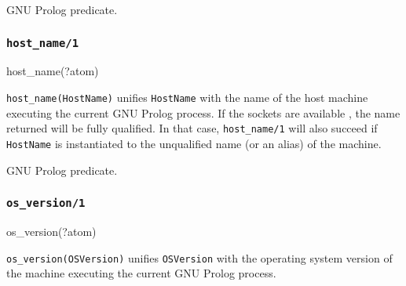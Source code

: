 \Portability

GNU Prolog predicate.

\subsubsection{\texttt{host\_name/1}}

\begin{TemplatesOneCol}
host\_name(?atom)

\end{TemplatesOneCol}

\Description

\texttt{host\_name(HostName)} unifies \texttt{HostName} with the name of the
host machine executing the current GNU Prolog process. If the sockets are
available , the name returned
will be fully qualified. In that case, \texttt{host\_name/1} will also
succeed if \texttt{HostName} is instantiated to the unqualified name (or an
alias) of the machine.

\begin{PlErrors}



\end{PlErrors}

\Portability

GNU Prolog predicate.

\subsubsection{\texttt{os\_version/1}}

\begin{TemplatesOneCol}
os\_version(?atom)

\end{TemplatesOneCol}

\Description

\texttt{os\_version(OSVersion)} unifies \texttt{OSVersion} with the
operating system version of the machine executing the current GNU Prolog
process.

\begin{PlErrors}



\end{PlErrors}

